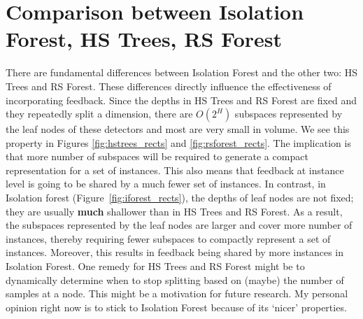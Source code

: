 \documentclass{article} %
\begin{document}
\section{Comparison between Isolation Forest, HS Trees, RS Forest}
There are fundamental differences between Isolation Forest and the other two: HS Trees and RS Forest. These differences directly influence the effectiveness of incorporating feedback. Since the depths in HS Trees and RS Forest are fixed and they repeatedly split a dimension, there are $O(2^H)$ subspaces represented by the leaf nodes of these detectors and most are very small in volume. We see this property in Figures \ref{fig:hstrees_rects} and \ref{fig:rsforest_rects}. The implication is that more number of subspaces will be required to generate a compact representation for a set of instances. This also means that feedback at instance level is going to be shared by a much fewer set of instances. In contrast, in Isolation forest (Figure~\ref{fig:iforest_rects}), the depths of leaf nodes are not fixed; they are usually \textbf{much} shallower than in HS Trees and  RS Forest. As a result, the subspaces represented by the leaf nodes are larger and cover more number of instances, thereby requiring fewer subspaces to compactly represent a set of instances. Moreover, this results in feedback being shared by more instances in Isolation Forest. One remedy for HS Trees and RS Forest might be to dynamically determine when to stop splitting based on (maybe) the number of samples at a node. This might be a motivation for future research. My personal opinion right now is to stick to Isolation Forest because of its `nicer' properties.
\end{document}

